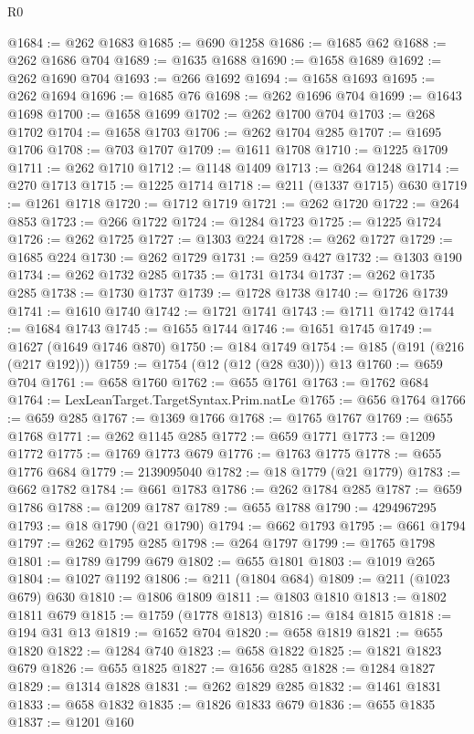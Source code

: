 \begin{lexlean}{R0}
\begin{coremodule}
@1684 := @262 @1683
@1685 := @690 @1258
@1686 := @1685 @62
@1688 := @262 @1686 @704
@1689 := @1635 @1688
@1690 := @1658 @1689
@1692 := @262 @1690 @704
@1693 := @266 @1692
@1694 := @1658 @1693
@1695 := @262 @1694
@1696 := @1685 @76
@1698 := @262 @1696 @704
@1699 := @1643 @1698
@1700 := @1658 @1699
@1702 := @262 @1700 @704
@1703 := @268 @1702
@1704 := @1658 @1703
@1706 := @262 @1704 @285
@1707 := @1695 @1706
@1708 := @703 @1707
@1709 := @1611 @1708
@1710 := @1225 @1709
@1711 := @262 @1710
@1712 := @1148 @1409
@1713 := @264 @1248
@1714 := @270 @1713
@1715 := @1225 @1714
@1718 := @211 (@1337 @1715) @630
@1719 := @1261 @1718
@1720 := @1712 @1719
@1721 := @262 @1720
@1722 := @264 @853
@1723 := @266 @1722
@1724 := @1284 @1723
@1725 := @1225 @1724
@1726 := @262 @1725
@1727 := @1303 @224
@1728 := @262 @1727
@1729 := @1685 @224
@1730 := @262 @1729
@1731 := @259 @427
@1732 := @1303 @190
@1734 := @262 @1732 @285
@1735 := @1731 @1734
@1737 := @262 @1735 @285
@1738 := @1730 @1737
@1739 := @1728 @1738
@1740 := @1726 @1739
@1741 := @1610 @1740
@1742 := @1721 @1741
@1743 := @1711 @1742
@1744 := @1684 @1743
@1745 := @1655 @1744
@1746 := @1651 @1745
@1749 := @1627 (@1649 @1746 @870)
@1750 := @184 @1749
@1754 := @185 (@191 (@216 (@217 @192)))
@1759 := @1754 (@12 (@12 (@28 @30))) @13
@1760 := @659 @704
@1761 := @658 @1760
@1762 := @655 @1761
@1763 := @1762 @684
@1764 := LexLeanTarget.TargetSyntax.Prim.natLe
@1765 := @656 @1764
@1766 := @659 @285
@1767 := @1369 @1766
@1768 := @1765 @1767
@1769 := @655 @1768
@1771 := @262 @1145 @285
@1772 := @659 @1771
@1773 := @1209 @1772
@1775 := @1769 @1773 @679
@1776 := @1763 @1775
@1778 := @655 @1776 @684
@1779 := 2139095040
@1782 := @18 @1779 (@21 @1779)
@1783 := @662 @1782
@1784 := @661 @1783
@1786 := @262 @1784 @285
@1787 := @659 @1786
@1788 := @1209 @1787
@1789 := @655 @1788
@1790 := 4294967295
@1793 := @18 @1790 (@21 @1790)
@1794 := @662 @1793
@1795 := @661 @1794
@1797 := @262 @1795 @285
@1798 := @264 @1797
@1799 := @1765 @1798
@1801 := @1789 @1799 @679
@1802 := @655 @1801
@1803 := @1019 @265
@1804 := @1027 @1192
@1806 := @211 (@1804 @684)
@1809 := @211 (@1023 @679) @630
@1810 := @1806 @1809
@1811 := @1803 @1810
@1813 := @1802 @1811 @679
@1815 := @1759 (@1778 @1813)
@1816 := @184 @1815
@1818 := @194 @31 @13
@1819 := @1652 @704
@1820 := @658 @1819
@1821 := @655 @1820
@1822 := @1284 @740
@1823 := @658 @1822
@1825 := @1821 @1823 @679
@1826 := @655 @1825
@1827 := @1656 @285
@1828 := @1284 @1827
@1829 := @1314 @1828
@1831 := @262 @1829 @285
@1832 := @1461 @1831
@1833 := @658 @1832
@1835 := @1826 @1833 @679
@1836 := @655 @1835
@1837 := @1201 @160

\end{coremodule}
\end{lexlean}
